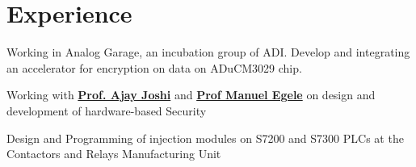 \documentclass[]{deedy_format_Anmol}
\begin{document}
\hfill
\begin{minipage}[t]{0.66\textwidth} 
%
%



\section{Experience}
\vspace{0.5mm} %

\vspace{\topsep} %
\vspace{1mm}
\justify
\begin{tightemize}
\item Working in Analog Garage, an incubation group of ADI. Develop and integrating an accelerator for encryption on data on ADuCM3029 chip.
\end{tightemize}
\vspace{\topsep}
\sectionsep

\vspace{1mm}
\justify
\begin{tightemize}
\item Working with \textbf{\href{https://www.bu.edu/eng/profile/ajay-joshi/}{Prof. Ajay Joshi}} and \textbf{\href{https://www.bu.edu/eng/profile/manuel-egele/}{Prof Manuel Egele}} on design and development of hardware-based Security
\end{tightemize}
\vspace{\topsep}
\sectionsep

\vspace{1mm}
\justify
\begin{tightemize}
\item Design and Programming of injection modules on S7200 and S7300 PLCs at the Contactors and Relays Manufacturing Unit
\end{tightemize}
\vspace{\topsep}
\sectionsep


\end{minipage}
\end{document}
